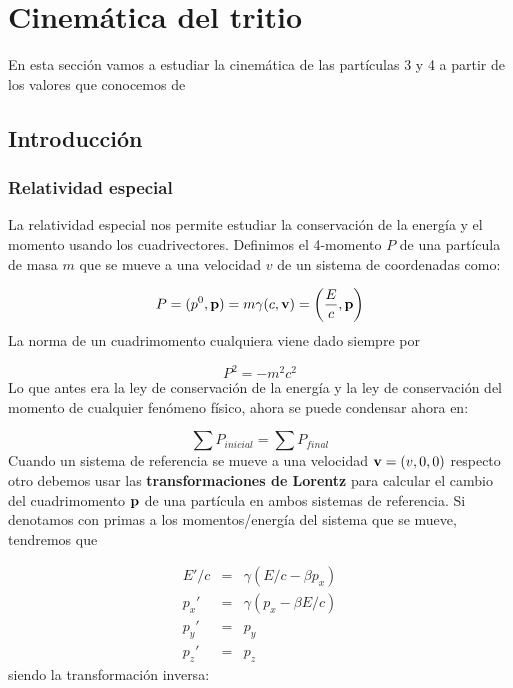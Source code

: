 \section{Cinemática del tritio}

En esta sección vamos a estudiar la cinemática de las partículas 3 y 4 a partir de los valores que conocemos de 

\subsection{Introducción}

\subsubsection{Relatividad especial}

La relatividad especial nos permite estudiar la conservación de la energía y el momento usando los cuadrivectores. Definimos el 4-momento $P$ de una partícula de masa $m$ que se mueve a una velocidad $v$ de un sistema de coordenadas como:

\begin{equation}
    P = (p^0, \mathbf{p}) = m \gamma (c,\mathbf{v}) =\left( \frac{E}{c},\mathbf{p} \right)   \label{Ec:01}
\end{equation}
La norma de un cuadrimomento cualquiera viene dado siempre por

\begin{equation}
    P^2  = - m^2 c^2  \label{Ec:02}
\end{equation}
Lo que antes era la ley de conservación de la energía y la ley de conservación del momento de cualquier fenómeno físico, ahora se puede condensar ahora en:

\begin{equation}
    \sum P_{inicial} = \sum P_{final} \label{Ec:03}
\end{equation}
Cuando un sistema de referencia se mueve a una velocidad $\mathbf{v}=(v,0,0)$ respecto otro debemos usar las \textbf{transformaciones de Lorentz} para calcular el cambio del cuadrimomento $\mathbf{p}$ de una partícula en ambos sistemas de referencia. Si denotamos con primas a los momentos/energía del sistema que se mueve, tendremos que

\begin{eqnarray}
    E'/c &  = & \gamma (E/c-\beta p_x) \label{Ec:04}\\ 
    p_x' &  = & \gamma (p_x - \beta E/c) \label{Ec:05}\\ 
    p_y' &  = & p_y \\
    p_z' &  = & p_z 
\end{eqnarray}
siendo la transformación inversa:

